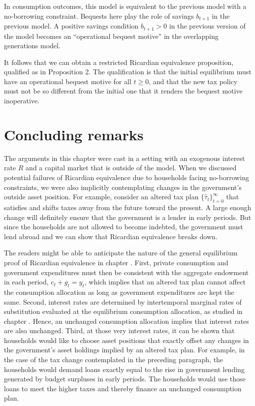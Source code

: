 In consumption outcomes, this model is equivalent to the previous model
with a no-borrowing constraint.  Bequests here play the
role of savings $b_{t+1}$ in the previous model.  A positive
savings condition $b_{t+1} >0$  in the previous version of the
model becomes an ``operational bequest motive'' in the overlapping
generations model.

  It follows that we can obtain a restricted Ricardian
equivalence proposition, qualified as in Proposition 2.
The qualification is that the initial equilibrium must have an operational
bequest motive for all $t \geq 0$, and that the new
tax policy must not be so different from  the initial one
that it renders the bequest motive inoperative.

\section{Concluding remarks}%
The arguments in this chapter were cast in a setting with
an exogenous interest rate $R$ and a capital market that is outside of the
model. When we discussed potential failures of Ricardian equivalence due to
households facing no-borrowing constraints, we were also implicitly
contemplating changes in the government's outside asset position. For example,
consider an altered tax plan $\{\hat \tau_t\}_{t=0}^\infty$ that satisfies 
and shifts taxes away from the future toward the present. A
large enough change will definitely ensure that the government is a lender
in early periods. But since the households are not allowed to become indebted,
the government must lend abroad and we can show that Ricardian equivalence
breaks down.

The readers might be able to  anticipate
 the nature of the general equilibrium proof of Ricardian
equivalence in chapter .
 First, private consumption and government
expenditures must then be consistent with the aggregate endowment in each
period, $c_t+g_t=y_t$, which implies that an altered tax plan cannot
affect the consumption allocation as long as government expenditures
are kept the same. Second, interest rates are determined by intertemporal
marginal rates
of substitution evaluated at the equilibrium consumption allocation, as
studied in chapter .
 Hence, an unchanged consumption allocation implies
that interest rates are also unchanged.
Third, at those very interest rates, it can be shown that households
would like to choose asset positions that exactly offset any changes in
the government's asset holdings implied by an altered tax plan.
For example, in the case of the tax change contemplated in the preceding
paragraph, the households would demand loans exactly equal to the
rise in government lending generated by budget surpluses in early periods.
The households would use those loans to meet the higher taxes and thereby
 finance an unchanged consumption plan.


